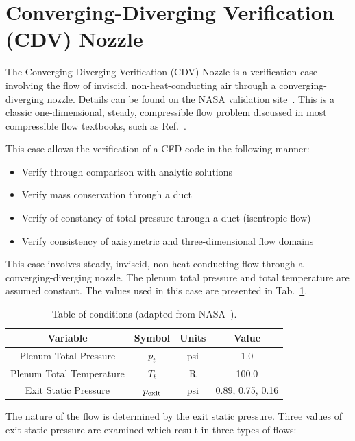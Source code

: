 \documentclass[12pt]{article}
\begin{document}
%
\section{Converging-Diverging Verification (CDV) Nozzle}

The Converging-Diverging Verification (CDV) Nozzle is a verification case involving the flow of inviscid,
non-heat-conducting air through a converging-diverging nozzle.
Details can be found on the NASA validation site~\citep{nasaCDV}.
This is a classic one-dimensional, steady, compressible flow problem discussed in most compressible flow textbooks,
such as Ref.~\citep{anderson}.

This case allows the verification of a CFD code in the following manner:

\begin{itemize}
\item Verify through comparison with analytic solutions
\item Verify mass conservation through a duct
\item Verify of constancy of total pressure through a duct (isentropic flow)
\item Verify consistency of axisymetric and three-dimensional flow domains
\end{itemize}


\medskip
This case involves steady, inviscid, non-heat-conducting flow through a converging-diverging nozzle.
The plenum total pressure and total temperature are assumed constant.
The values used in this case are presented in Tab.~\ref{tab:conditions}.

\begin{table}[ht!]
\centering
\begin{tabular}{cccc}
\hline
Variable & Symbol & Units & Value \\
\hline
Plenum Total Pressure    & $p_t$          &  psi & 1.0    \\
Plenum Total Temperature & $T_t$          & R    & 100.0  \\
Exit Static Pressure     & $p_{\rm exit}$ & psi  & 0.89, 0.75, 0.16 \\
\hline
\end{tabular}
\caption{Table of conditions (adapted from NASA~\citep{nasaCDV}).}
\label{tab:conditions}
\end{table}

The nature of the flow is determined by the exit static pressure.
Three values of exit static pressure are examined which result in three types of flows:
\end{document}
